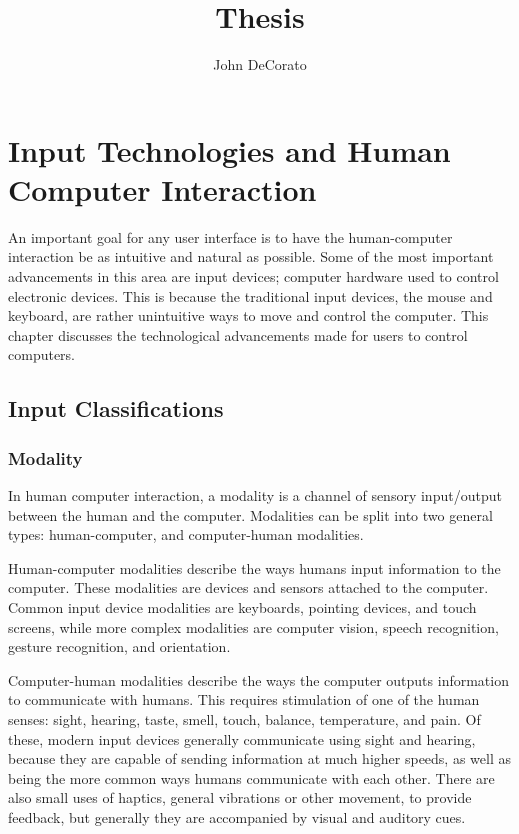 \documentclass[11pt]{report}
\title{Thesis}
\author{John DeCorato}
\date{ }
\begin{document}
\chapter{Input Technologies and Human Computer Interaction}

An important goal for any user interface is to have the human-computer interaction be as intuitive and natural as possible.
Some of the most important advancements in this area are input devices; computer hardware used to control electronic devices.
This is because the traditional input devices, the mouse and keyboard, are rather unintuitive ways to move and control the computer.
This chapter discusses the technological advancements made for users to control computers.



\section{Input Classifications}

\subsection{Modality}

In human computer interaction, a modality is a channel of sensory input/output between the human and the computer. Modalities can be split into two general types: human-computer, and computer-human modalities.

Human-computer modalities describe the ways humans input information to the computer.
These modalities are devices and sensors attached to the computer.
Common input device modalities are keyboards, pointing devices, and touch screens, while more complex modalities are computer vision, speech recognition, gesture recognition, and orientation.

Computer-human modalities describe the ways the computer outputs information to communicate with humans.
This requires stimulation of one of the human senses: sight, hearing, taste, smell, touch, balance, temperature, and pain. 
Of these, modern input devices generally communicate using sight and hearing, because they are capable of sending information at much higher speeds, as well as being the more common ways humans communicate with each other.
There are also small uses of haptics, general vibrations or other movement, to provide feedback, but generally they are accompanied by visual and auditory cues.
\end{document}
